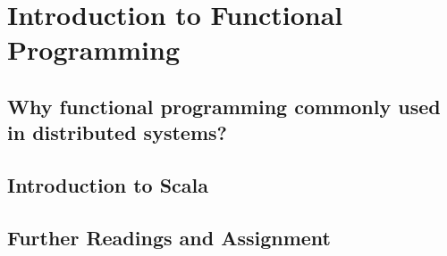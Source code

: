 \section{Introduction to Functional Programming}
\subsection{Why functional programming commonly used in distributed systems?}
\subsection{Introduction to Scala}
\subsection{Further Readings and Assignment}
